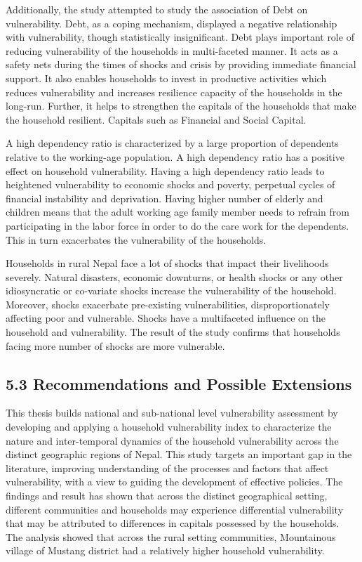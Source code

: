 Additionally, the study attempted to study the association of Debt on vulnerability. Debt, as a coping mechanism, displayed a negative relationship with vulnerability, though statistically insignificant. Debt plays important role of reducing vulnerability of the households in multi-faceted manner. It acts as a safety nets during the times of shocks and crisis by providing immediate financial support. It also enables households to invest in productive activities which reduces vulnerability and increases resilience capacity of the households in the long-run. Further, it helps to strengthen the capitals of the households that make the household resilient. Capitals such as Financial and Social Capital.  

A high dependency ratio is characterized by a large proportion of dependents relative to the working-age population. A high dependency ratio has a positive effect on household vulnerability. Having a high dependency ratio leads to heightened vulnerability to economic shocks and poverty, perpetual cycles of financial instability and deprivation. Having higher number of elderly and children means that the adult working age family member needs to refrain from participating in the labor force in order to do the care work for the dependents. This in turn exacerbates the vulnerability of the households. 

Households in rural Nepal face a lot of shocks that impact their livelihoods severely. Natural disasters, economic downturns, or health shocks or any other idiosyncratic or co-variate shocks increase the vulnerability of the household. Moreover, shocks exacerbate pre-existing vulnerabilities, disproportionately affecting poor and vulnerable. Shocks have a multifaceted influence on the household and vulnerability. The result of the study confirms that households facing more number of shocks are more vulnerable. 

\subsection*{5.3 Recommendations and Possible Extensions}
\renewcommand{\thepage}{\arabic{page}}
This thesis builds national and sub-national level vulnerability assessment \cite{antwi2013characterising, aksha2019analysis, shahiestimating} by developing and applying a household vulnerability index to characterize the nature and inter-temporal dynamics of the household vulnerability across the distinct geographic regions of Nepal. This study targets an important gap in the literature, improving understanding of the processes and factors that affect vulnerability, with a view to guiding the development of effective policies. The findings and result has shown that across the distinct geographical setting, different communities and households may experience differential vulnerability that may be attributed to differences in capitals possessed by the households. The analysis showed that across the rural setting communities, Mountainous village of Mustang district had a relatively higher household vulnerability. 

